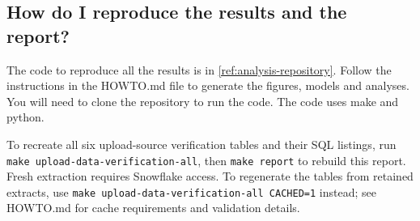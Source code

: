 \subsection{How do I reproduce the results and the report?}
The code to reproduce all the results is in \ref{ref:analysis-repository}. Follow the instructions in the HOWTO.md file to generate the figures, models and analyses. You will need to clone the repository to run the code. The code uses make and python.

To recreate all six upload-source verification tables and their SQL listings,
run \texttt{make upload-data-verification-all}, then \texttt{make report} to
rebuild this report. Fresh extraction requires Snowflake access. To regenerate
the tables from retained extracts, use
\texttt{make upload-data-verification-all CACHED=1} instead; see HOWTO.md for
cache requirements and validation details.
